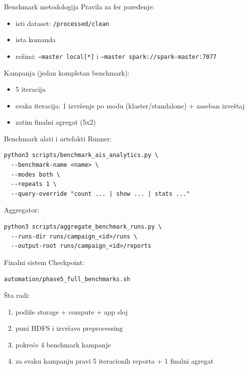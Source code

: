 \documentclass[aspectratio=169,11pt]{beamer}
\newcommand{\code}[1]{\texttt{\small #1}}
\begin{document}
\begin{frame}{Benchmark metodologija}
  Pravila za fer poređenje:
  \begin{itemize}
    \item isti dataset: \code{/processed/clean}
    \item ista komanda
    \item režimi: \code{--master local[*]} i \code{--master spark://spark-master:7077}
  \end{itemize}

  \vspace{0.35cm}
  Kampanja (jedan kompletan benchmark):
  \begin{itemize}
    \item 5 iteracija
    \item svaka iteracija: 1 izvršenje po modu (klaster/standalone) + zaseban izveštaj
    \item zatim finalni agregat (5x2)
  \end{itemize}
\end{frame}

\begin{frame}[fragile]{Benchmark alati i artefakti}
  Runner:
  \begin{verbatim}
python3 scripts/benchmark_ais_analytics.py \
  --benchmark-name <name> \
  --modes both \
  --repeats 1 \
  --query-override "count ... | show ... | stats ..."
  \end{verbatim}

  Aggregator:
  \begin{verbatim}
python3 scripts/aggregate_benchmark_runs.py \
  --runs-dir runs/campaign_<id>/runs \
  --output-root runs/campaign_<id>/reports
  \end{verbatim}
\end{frame}

\begin{frame}{Finalni sistem}
  Checkpoint:
  \begin{center}
    \code{automation/phase5\_full\_benchmarks.sh}
  \end{center}

  \vspace{0.35cm}
  Šta radi:
  \begin{enumerate}
    \item podiže storage + compute + app sloj
    \item puni HDFS i izvršava preprocessing
    \item pokreće 4 benchmark kampanje
    \item za svaku kampanju pravi 5 iteracionih reporta + 1 finalni agregat
  \end{enumerate}
\end{frame}
\end{document}
